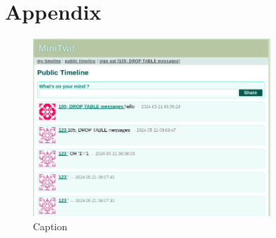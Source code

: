\documentclass[11pt]{article}
\begin{document}
 


\newpage




\section{Appendix}
\begin{figure}
    \centering
    \includegraphics[width=0.8\textwidth]{images/sql_injections.png}
    \caption{Caption}
    \label{fig:sqlinjections}
\end{figure}
\end{document}
